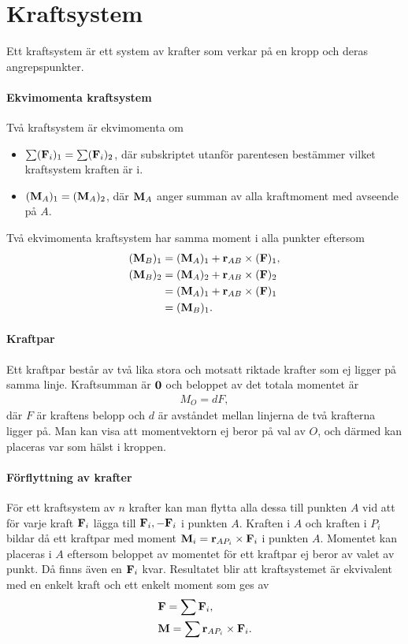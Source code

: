 \section{Kraftsystem}
Ett kraftsystem är ett system av krafter som verkar på en kropp och deras angrepspunkter.

\paragraph{Ekvimomenta kraftsystem}
Två kraftsystem är ekvimomenta om
\begin{itemize}
	\item $\sum(\vect{F}_i)_1 = \sum(\vect{F}_i)_2$, där subskriptet utanför parentesen bestämmer vilket kraftsystem kraften är i.
	\item $(\vect{M}_A)_1 = (\vect{M}_A)_2$, där $\vect{M}_A$ anger summan av alla kraftmoment med avseende på $A$.
\end{itemize}

Två ekvimomenta kraftsystem har samma moment i alla punkter eftersom
\begin{align*}
	(\vect{M}_B)_1 &= (\vect{M}_A)_1 + \vect{r}_{AB}\times (\vect{F})_1, \\
	(\vect{M}_B)_2 &= (\vect{M}_A)_2 + \vect{r}_{AB}\times (\vect{F})_2 \\
	               &= (\vect{M}_A)_1 + \vect{r}_{AB}\times (\vect{F})_1 \\
	               &= (\vect{M}_B)_1.
\end{align*}

\paragraph{Kraftpar}
Ett kraftpar består av två lika stora och motsatt riktade krafter som ej ligger på samma linje. Kraftsumman är $\vect{0}$ och beloppet av det totala momentet är
\begin{align*}
	M_O = dF,
\end{align*}
där $F$ är kraftens belopp och $d$ är avståndet mellan linjerna de två krafterna ligger på. Man kan visa att momentvektorn ej beror på val av $O$, och därmed kan placeras var som hälst i kroppen.

\paragraph{Förflyttning av krafter}
För ett kraftsystem av $n$ krafter kan man flytta alla dessa till punkten $A$ vid att för varje kraft $\vect{F}_i$ lägga till $\vect{F}_i, -\vect{F}_i$ i punkten $A$. Kraften i $A$ och kraften i $P_i$ bildar då ett kraftpar med moment $\vect{M}_i = \vect{r}_{AP_i}\times \vect{F}_i$ i punkten $A$. Momentet kan placeras i $A$ eftersom beloppet av momentet för ett kraftpar ej beror av valet av punkt. Då finns även en $\vect{F}_i$ kvar. Resultatet blir att kraftsystemet är ekvivalent med en enkelt kraft och ett enkelt moment som ges av
\begin{align*}
	&\vect{F} = \sum\vect{F}_i, \\
	&\vect{M} = \sum\vect{r}_{AP_i}\times\vect{F}_i.
\end{align*}

